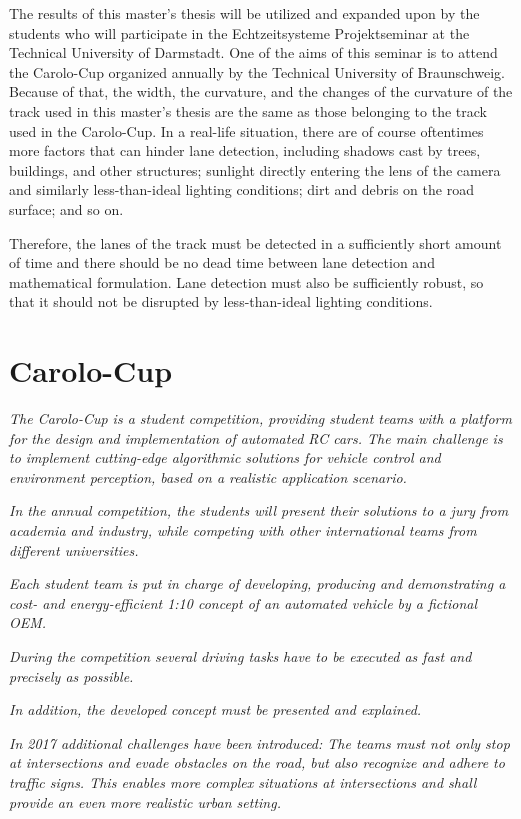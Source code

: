 The results of this master's thesis will be utilized and expanded upon by the students who will participate in the Echtzeitsysteme Projektseminar at the Technical University of Darmstadt. One of the aims of this seminar is to attend the Carolo-Cup organized annually by the Technical University of Braunschweig. Because of that, the width, the curvature, and the changes of the curvature of the track used in this master's thesis are the same as those belonging to the track used in the Carolo-Cup. In a real-life situation, there are of course oftentimes more factors that can hinder lane detection, including shadows cast by trees, buildings, and other structures; sunlight directly entering the lens of the camera and similarly less-than-ideal lighting conditions; dirt and debris on the road surface; and so on.

Therefore, the lanes of the track must be detected in a sufficiently short amount of time and there should be no dead time between lane detection and mathematical 
formulation. Lane detection must also be sufficiently robust, so that it should not be disrupted by less-than-ideal lighting conditions.


\section{Carolo-Cup}\label{sec:Carolo-Cup}

\emph{\color{red}The Carolo-Cup is a student competition, providing student teams with a platform for the design and implementation of automated RC cars. The main challenge is to implement cutting-edge algorithmic solutions for vehicle control and environment perception, based on a realistic application scenario.}

\emph{\color{red}In the annual competition, the students will present their solutions to a jury from academia and industry, while competing with other international teams from different universities.}

\emph{\color{red}Each student team is put in charge of developing, producing and demonstrating a cost- and energy-efficient 1:10 concept of an automated vehicle by a fictional OEM.}

\emph{\color{red}During the competition several driving tasks have to be executed as fast and precisely as possible.}

\emph{\color{red}In addition, the developed concept must be presented and explained.}

\emph{\color{red}In 2017 additional challenges have been introduced: The teams must not only stop at intersections and evade obstacles on the road, but also recognize and adhere to traffic signs. This enables more complex situations at intersections and shall provide an even more realistic urban setting.}



